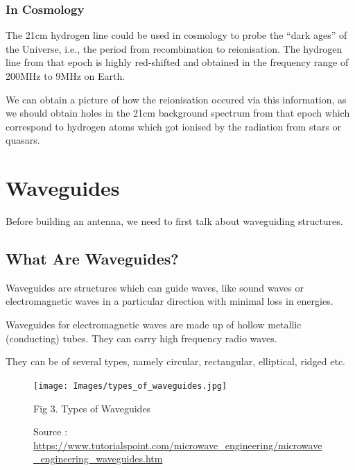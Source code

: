 \documentclass[12pt]{article}
\begin{document}
\subsubsection{In Cosmology} %
The 21cm hydrogen line could be used in cosmology to probe the ``dark ages'' of the Universe, i.e., the period from recombination to reionisation. \linebreak
The hydrogen line from that epoch is highly red-shifted and obtained in the frequency range of 200MHz to 9MHz on Earth. \linebreak

We can obtain a picture of how the reionisation occured via this information, as we should obtain holes in the 21cm background spectrum from that epoch which correspond to hydrogen atoms which got ionised by the radiation from stars or quasars.
\section{Waveguides}
Before building an antenna, we need to first talk about waveguiding structures. 
\subsection{What Are Waveguides?}
Waveguides are structures which can guide waves, like sound waves or electromagnetic waves in a particular direction with minimal loss in energies. \linebreak

Waveguides for electromagnetic waves are made up of hollow metallic (conducting) tubes. They can carry high frequency radio waves. \linebreak

They can be of several types, namely circular, rectangular, elliptical, ridged etc. 
\begin{figure}[H]
  \centering
  \texttt{[image: Images/types\_of\_waveguides.jpg]}
  \caption{Fig 3. Types of Waveguides}
  \caption{\tiny Source : \url{https://www.tutorialspoint.com/microwave_engineering/microwave_engineering_waveguides.htm}}
\end{figure}
\end{document}
